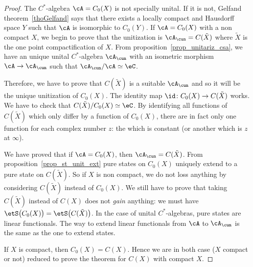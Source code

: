 \begin{proof}
	The $C^*$-algebra  $\cA=C_0(X)$ is not specially unital. If it is not, Gelfand theorem~\ref{thoGelfand} says that there exists a locally compact and Hausdorff space $Y$ such that $\cA$ is isomorphic to $C_0(Y)$. If $\cA=C_0(X)$ with a non compact $X$, we begin to prove that the unitization is $\cA_{\cun}=C(\tilde X)$ where $\tilde X$ is the one point compactification of $X$. From proposition~\ref{prop_unitariz_csa}, we have an unique unital $C^*$-algebra $\cA_{\cun}$  with an isometric morphism $\cA\to\cA_{\cun}$ such that $\cA_{\cun}/\cA\simeq \eC$.

	Therefore, we have to prove that $C(\tilde X)$ is a suitable $\cA_{\cun}$ and so it will be the unique unitization of $C_0(X)$. The identity map $\id\colon C_0(X)\to C(\tilde X)$ works. We have to check that $C(\tilde X)/C_0(X)\simeq\eC$. By identifying all functions of $C(\tilde X)$ which only differ by a function of $C_0(X)$, there are in fact only one function for each complex number $z$: the which is constant (or another which is $z$ at $\infty$).

	We have proved that if $\cA=C_0(X)$, then $\cA_{\cun}=C(\tilde X)$. From proposition~\ref{prop_st_unit_ext} pure states on $C_0(X)$ uniquely extend to a pure state on $C(\tilde X)$. So if $X$ is non compact, we do not loss anything by considering $C(\tilde X)$ instead of $C_0(X)$. We still have to prove that taking $C(\tilde X)$ instead of $C(X)$ does not \emph{gain} anything: we must have $\etS\big( C_0(X) \big)=\etS\big( C(\tilde X) \big)$. In the case of unital $C^*$-algebras, pure states are linear functionals. The way to extend linear functionals from $\cA$ to $\cA_{\cun}$ is the same as the one to extend states.

	If $X$ is compact, then $C_0(X)=C(X)$. Hence we are in both case ($X$ compact or not) reduced to prove the theorem for $C(X)$ with compact $X$.


\end{proof}
